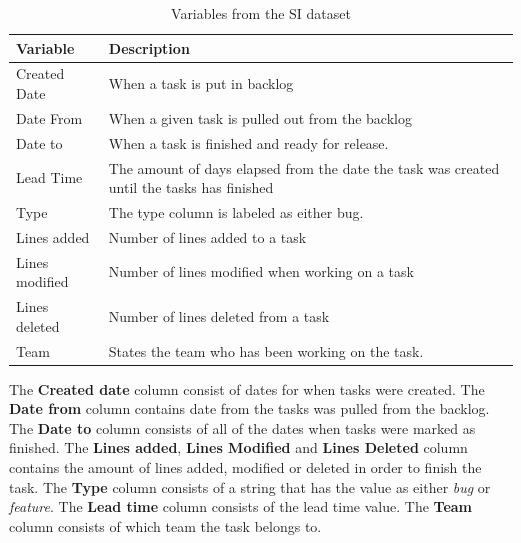 \documentclass[UKenglish]{ifimaster}  %
\begin{document}
\begin{table}[!ht]
\begin{center}
    \begin{tabular}{| l | p{5cm} |}
    \hline
     \bf{Variable} & \bf{Description}\\ \hline
     Created Date & When a task is put in backlog \\ \hline
     Date From & When a given task is pulled out from the backlog\\ \hline
     Date to & When a task is finished and ready for release. \\ \hline
    Lead Time & The amount of days elapsed from the date the task was created until the tasks has finished  \\ \hline
   Type & The type column is labeled as either bug. \\ \hline
   Lines added & Number of lines added to a task \\ \hline
   Lines modified & Number of lines modified when working on a task \\ \hline
   Lines deleted & Number of lines deleted from a task \\
    \hline
    Team &States the team who has been working on the task.\\ \hline
    \end{tabular}
\caption{Variables from the SI dataset}
\label{IC} %
\end{center}
\end{table}

\newpage
The \textbf{Created date} column consist of dates for when tasks were created. 
The \textbf{Date from} column contains date from the tasks was pulled from the backlog. 
The \textbf{Date to} column consists of all of the dates when tasks were marked as finished.
The \textbf{Lines added}, \textbf{Lines Modified} and \textbf{Lines Deleted} column contains the amount of lines added, modified or deleted in order to finish the task.
The \textbf{Type} column consists of a string that has the value as either \textit{bug} or \textit{feature}.
The \textbf{Lead time} column consists of the lead time value. 
The \textbf{Team} column consists of which team the task belongs to. 
\end{document}
